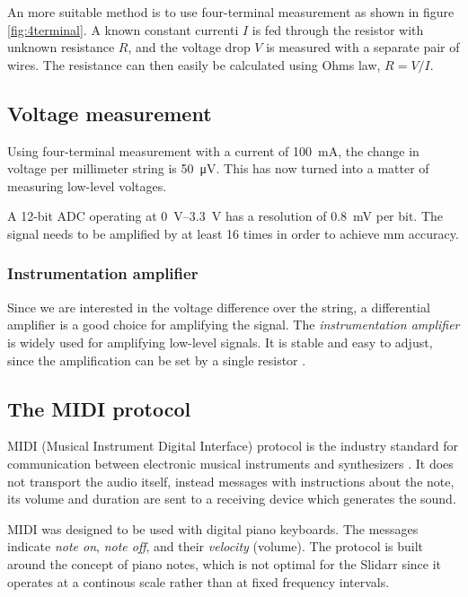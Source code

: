 \documentclass{article}
\begin{document}
An more suitable method is to use four-terminal measurement as shown in figure \ref{fig:4terminal}. A known constant currenti $I$ is fed through the resistor with unknown resistance $R$, and the voltage drop $V$ is measured with a separate pair of wires. The resistance can then easily be calculated using Ohms law, $ R = V / I $.

\subsection{Voltage measurement} \label{sec:voltage_measurement}
Using four-terminal measurement with a current of \SI{100}{\milli\ampere}, the change in voltage per millimeter string is \SI{50}{\micro\volt}. This has now turned into a matter of measuring low-level voltages.

A 12-bit ADC operating at \SIrange{0}{3.3}{\volt} has a resolution of \SI{0.8}{\milli\volt} per bit. The signal needs to be amplified by at least 16 times in order to achieve \si{\milli\meter} accuracy.

\subsubsection{Instrumentation amplifier}
Since we are interested in the voltage difference over the string, a differential amplifier is a good choice for amplifying the signal. The \textit{instrumentation amplifier} is widely used for amplifying low-level signals. It is stable and easy to adjust, since the amplification can be set by a single resistor \cite{in}.

\subsection{The MIDI protocol}
MIDI (Musical Instrument Digital Interface) protocol is the industry standard for communication between electronic musical instruments and synthesizers \cite{midiorg}. It does not transport the audio itself, instead messages with instructions about the note, its volume and duration are sent to a receiving device which generates the sound. 

MIDI was designed to be used with digital piano keyboards. The messages indicate \textit{note on}, \textit{note off}, and their \textit{velocity} (volume). The protocol is built around the concept of piano notes, which is not optimal for the Slidarr since it operates at a continous scale rather than at fixed frequency intervals.
\end{document}
